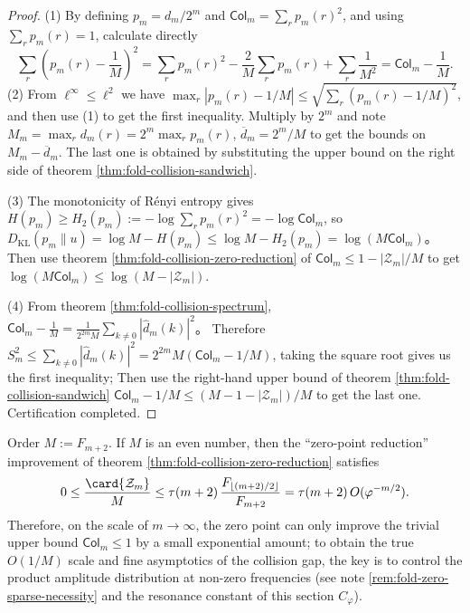 \begin{proof}
(1) By defining \(p_m=d_m/2^m\) and \(\mathsf{Col}_m=\sum_r p_m(r)^2\), and using \(\sum_r p_m(r)=1\), calculate directly
\[
\sum_r\left(p_m(r)-\frac{1}{M}\right)^2
=\sum_r p_m(r)^2-\frac{2}{M}\sum_r p_m(r)+\sum_r\frac{1}{M^2}
=\mathsf{Col}_m-\frac{1}{M}.
\]
(2) From \(\ell^\infty\le \ell^2\) we have \(\max_r|p_m(r)-1/M|\le \sqrt{\sum_r(p_m(r)-1/M)^2}\), and then use (1) to get the first inequality.
Multiply by \(2^m\) and note \(M_m=\max_r d_m(r)=2^m\max_r p_m(r)\), \(\overline d_m=2^m/M\) to get the bounds on \(M_m-\overline d_m\). The last one is obtained by substituting the upper bound on the right side of theorem \ref{thm:fold-collision-sandwich}.
\par
(3) The monotonicity of Rényi entropy gives \(H(p_m)\ge H_2(p_m):=-\log\sum_r p_m(r)^2=-\log \mathsf{Col}_m\), so
\(
D_{\mathrm{KL}}(p_m\|u)=\log M-H(p_m)\le \log M-H_2(p_m)=\log(M\mathsf{Col}_m)
\)。
Then use theorem \ref{thm:fold-collision-zero-reduction} of \(\mathsf{Col}_m\le 1-|\mathcal{Z}_m|/M\) to get \(\log(M\mathsf{Col}_m)\le \log(M-|\mathcal{Z}_m|)\).
\par
(4) From theorem \ref{thm:fold-collision-spectrum},
\(
\mathsf{Col}_m-\frac{1}{M}=\frac{1}{2^{2m}M}\sum_{k\ne 0}|\widehat d_m(k)|^2
\)。
Therefore \(S_m^2\le \sum_{k\ne 0}|\widehat d_m(k)|^2=2^{2m}M(\mathsf{Col}_m-1/M)\), taking the square root gives us the first inequality;
Then use the right-hand upper bound of theorem \ref{thm:fold-collision-sandwich} \(\mathsf{Col}_m-1/M\le (M-1-|\mathcal{Z}_m|)/M\) to get the last one. Certification completed.
\end{proof}

\begin{corollary}
\label{cor:fold-collision-zero-sparsity-impact}
Order \(M:=F_{m+2}\). If \(M\) is an even number, then the “zero-point reduction” improvement of theorem \ref{thm:fold-collision-zero-reduction} satisfies
\[
0\le \frac{\card{\mathcal{Z}_m}}{M}
\le
\tau(m+2)\,\frac{F_{\lfloor (m+2)/2\rfloor}}{F_{m+2}}
=\tau(m+2)\,O(\varphi^{-m/2}).
\]
Therefore, on the scale of \(m\to\infty\), the zero point can only improve the trivial upper bound \(\mathsf{Col}_m\le 1\) by a small exponential amount; to obtain the true \(O(1/M)\) scale and fine asymptotics of the collision gap, the key is to control the product amplitude distribution at non-zero frequencies (see note \ref{rem:fold-zero-sparse-necessity} and the resonance constant of this section \(C_\varphi\)).
\end{corollary}


